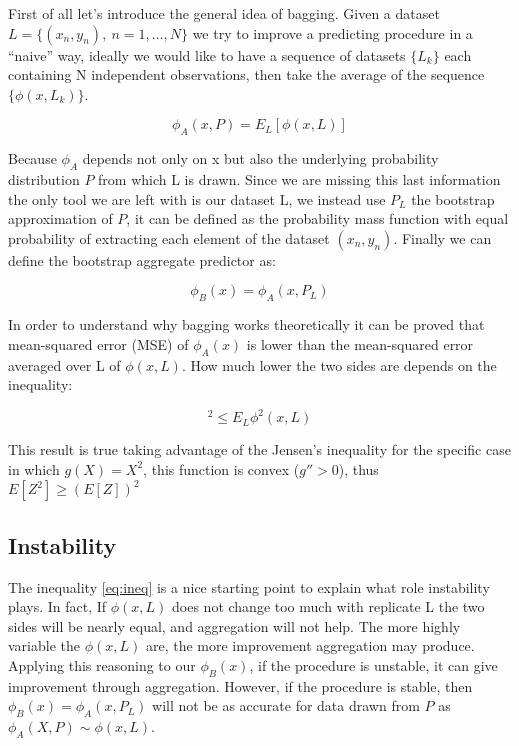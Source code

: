 \documentclass[
]{article}
\begin{document}
First of all let's introduce the general idea of bagging. Given a
dataset \(L=\{(x_n,y_n),\ n=1, \ldots ,N\}\) we try to improve a
predicting procedure in a ``naive'' way, ideally we would like to have a
sequence of datasets \(\{L_k\}\) each containing N independent
observations, then take the average of the sequence
\(\{\phi(x, L_k)\}\).

\begin{equation}
\phi_A(x,P)=E_L[\phi(x,L)]\label{eq:agg}
\end{equation}

Because \(\phi_A\) depends not only on x but also the underlying
probability distribution \(P\) from which L is drawn. Since we are
missing this last information the only tool we are left with is our
dataset L, we instead use \(P_L\) the bootstrap approximation of \(P\),
it can be defined as the probability mass function with equal
probability of extracting each element of the dataset \((x_n,y_n)\).
Finally we can define the bootstrap aggregate predictor as:

\begin{equation}
\phi_B (x)=\phi_A(x,P_L)\label{eq:boot}
\end{equation}

In order to understand why bagging works theoretically it can be proved
that mean-squared error (MSE) of \(\phi_A(x)\) is lower than the
mean-squared error averaged over L of \(\phi(x,L)\). How much lower the
two sides are depends on the inequality:

\begin{equation}
[E_L\phi(x,L)]^2\leq E_L\phi^2(x,L)\label{eq:ineq}
\end{equation}

This result is true taking advantage of the Jensen's inequality for the
specific case in which \(g(X)=X^2\), this function is convex
(\(g''>0\)), thus \(E[Z^2] \geq (E[Z])^2\)

\hypertarget{instability}{%
\subsection{Instability}\label{instability}}

The inequality \ref{eq:ineq} is a nice starting point to explain what
role instability plays. In fact, If \(\phi(x, L)\) does not change too
much with replicate L the two sides will be nearly equal, and
aggregation will not help. The more highly variable the \(\phi(x, L)\)
are, the more improvement aggregation may produce. Applying this
reasoning to our \(\phi_B (x)\), if the procedure is unstable, it can
give improvement through aggregation. However, if the procedure is
stable, then \(\phi_B (x)=\phi_A(x,P_L)\) will not be as accurate for
data drawn from \(P\) as \(\phi_A(X, P) \sim \phi(x,L)\).
\end{document}
